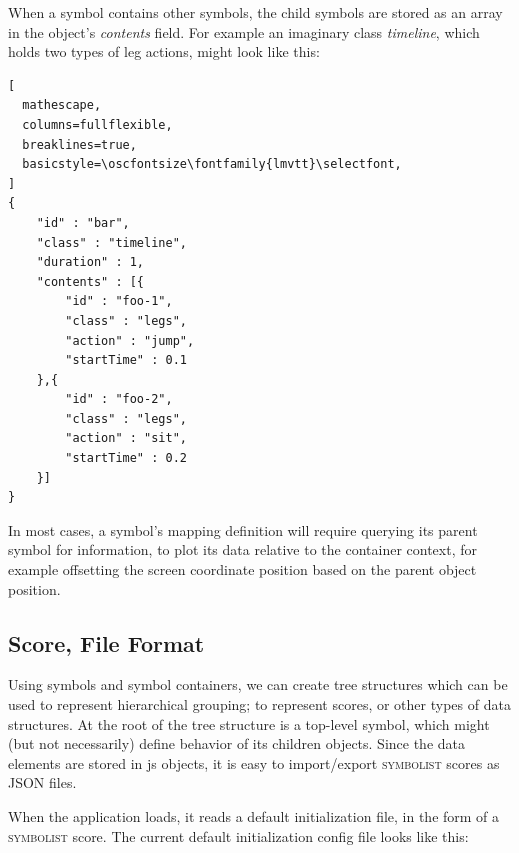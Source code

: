 \documentclass{article}
\def\symbolist{\textsc{symbolist}\xspace}
\def\oscfontsize{\footnotesize}
\begin{document}
When a symbol contains other symbols, the child symbols are stored as an array in the object's \textit{contents} field. For example an imaginary class \textit{timeline}, which holds two types of leg actions, might look like this:

\begin{lstlisting}[
  mathescape,
  columns=fullflexible,
  breaklines=true,
  basicstyle=\oscfontsize\fontfamily{lmvtt}\selectfont,
]
{
    "id" : "bar",
    "class" : "timeline",
    "duration" : 1,
    "contents" : [{
        "id" : "foo-1",
        "class" : "legs",
        "action" : "jump",
        "startTime" : 0.1
    },{
        "id" : "foo-2",
        "class" : "legs",
        "action" : "sit",
        "startTime" : 0.2
    }]
}

\end{lstlisting}

In most cases, a symbol's mapping definition will require querying its parent symbol for information, to plot its data relative to the container context, for example offsetting the screen coordinate position based on the parent object position.

\subsection{Score, File Format}\label{json_files}

Using symbols and symbol containers, we can create tree structures which can be used to represent hierarchical grouping; to represent scores, or other types of data structures.
At the root of the tree structure is a top-level symbol, which might (but not necessarily) define behavior of its children objects.
Since the data elements are stored in js objects, it is easy to import/export \symbolist scores as JSON files.

When the application loads, it reads a default initialization file, in the form of a \symbolist score.
The current default initialization config file looks like this:
\end{document}
